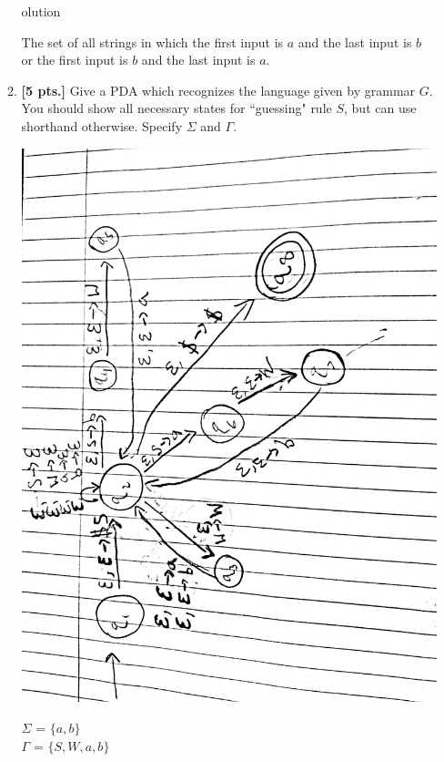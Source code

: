 \documentclass[11pt]{article}
\theoremstyle{definition}
\theoremstyle{theorem}
\newcommand{\solution}{\medskip\noindent{\color{blue}\textbf{Solution:}}}
\begin{document}
\begin{enumerate}[label=(\alph*)]
\begin{enumerate}[label=(\alph*)]
olution 

The set of all strings in which the first input is $a$ and the last input is $b$ or the first input is $b$ and the last input is $a$.

\item \textbf{[5 pts.]} Give a PDA which recognizes the language given by grammar $G$. You should show all necessary states for ``guessing" rule $S$, but can use shorthand otherwise. Specify $\Sigma$ and $\Gamma$.

\solution

\includegraphics[angle=270,origin=c, scale=0.12]{./p2/hw3q2b.jpg}

$\Sigma$ = $\{a, b\}$ \\
$\Gamma$ = $\{S, W, a, b\}$ 






\end{enumerate}


\newpage


\end{enumerate}
\end{document}
